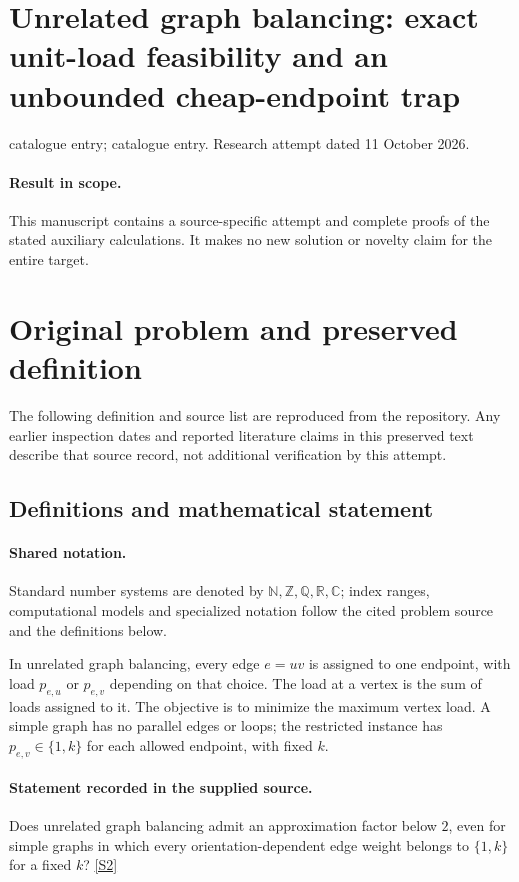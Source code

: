 \documentclass[11pt]{article}
\begin{document}
\section*{Unrelated graph balancing: exact unit-load feasibility and an unbounded cheap-endpoint trap}
\noindent catalogue entry; catalogue entry. Research attempt dated 11 October 2026.
\paragraph{Result in scope.}This manuscript contains a source-specific attempt and complete proofs of the stated auxiliary calculations. It makes no new solution or novelty claim for the entire target.
\section{Original problem and preserved definition}
The following definition and source list are reproduced from the repository. Any earlier inspection dates and reported literature claims in this preserved text describe that source record, not additional verification by this attempt.
\subsection{Definitions and mathematical statement}

\paragraph{Shared notation.}Standard number systems are denoted by $\mathbb N,\mathbb Z,\mathbb Q,\mathbb R,\mathbb C$; index ranges, computational models and specialized notation follow the cited problem source and the definitions below.


In unrelated graph balancing, every edge $e=uv$ is assigned to one endpoint, with load $p_{e,u}$ or $p_{e,v}$ depending on that choice. The load at a vertex is the sum of loads assigned to it. The objective is to minimize the maximum vertex load. A simple graph has no parallel edges or loops; the restricted instance has $p_{e,v}\in\{1,k\}$ for each allowed endpoint, with fixed $k$.
\paragraph{Statement recorded in the supplied source.}
Does unrelated graph balancing admit an approximation factor below $2$, even for simple graphs in which every orientation-dependent edge weight belongs to $\{1,k\}$ for a fixed $k$? \href{https://doi.org/10.4171/owr/2021/53}{[S2]}
\end{document}
